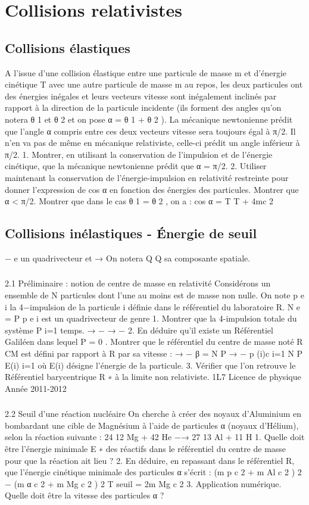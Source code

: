 
\section{Collisions relativistes}%

\subsection{Collisions élastiques}%
A l’issue d’une collision élastique entre une particule de masse m et d’énergie cinétique T avec
une autre particule de masse m au repos, les deux particules ont des énergies inégales et leurs
vecteurs vitesse sont inégalement inclinés par rapport à la direction de la particule incidente (ils
forment des angles qu’on notera θ 1 et θ 2 et on pose α = θ 1 + θ 2 ). La mécanique newtonienne
prédit que l’angle α compris entre ces deux vecteurs vitesse sera toujours égal à π/2. Il n’en va
pas de même en mécanique relativiste, celle-ci prédit un angle inférieur à π/2.
1. Montrer, en utilisant la conservation de l’impulsion et de l’énergie cinétique, que la mécanique newtonienne prédit que α = π/2.
2. Utiliser maintenant la conservation de l’énergie-impulsion en relativité restreinte pour donner l’expression de cos α en fonction des énergies des particules. Montrer que α < π/2.
Montrer que dans le cas θ 1 = θ 2 , on a :
cos α =
T
T + 4mc 2
\subsection{Collisions inélastiques - Énergie de seuil}%
−
e un quadrivecteur et →
On notera Q
Q sa composante spatiale.
\subsubsection{}
2.1 Préliminaire : notion de centre de masse en relativité
Considérons un ensemble de N particules dont l’une au moins est de masse non nulle. On note
p e i la 4−impulsion de la particule i définie dans le référentiel du laboratoire R.
N
e = P p e i est un quadrivecteur de genre
1. Montrer que la 4-impulsion totale du système P
i=1
temps.
→
−
→
−
2. En déduire qu’il existe un Référentiel Galiléen dans lequel P = 0 . Montrer que le
référentiel du centre de masse noté R CM est défini par rapport à R par sa vitesse :
→
−
β =
N
P
→
−
p (i)c
i=1
N
P
E(i)
i=1
où E(i) désigne l’énergie de la particule.
3. Vérifier que l’on retrouve le Référentiel barycentrique R ∗ à la limite non relativiste.
1L7
Licence de physique
Année 2011-2012
\subsubsection{}
2.2 Seuil d’une réaction nucléaire
On cherche à créer des noyaux d’Aluminium en bombardant une cible de Magnésium à l’aide de
particules α (noyaux d’Hélium), selon la réaction suivante :
24
12 Mg
+ 42 He
−→
27
13 Al
+ 11 H
1. Quelle doit être l’énergie minimale E ∗ des réactifs dans le référentiel du centre de masse
pour que la réaction ait lieu ?
2. En déduire, en repassant dans le référentiel R, que l’énergie cinétique minimale des particules α s’écrit :
(m p c 2 + m Al c 2 ) 2 − (m α c 2 + m Mg c 2 ) 2
T seuil =
2m Mg c 2
3. Application numérique. Quelle doit être la vitesse des particules α ?
